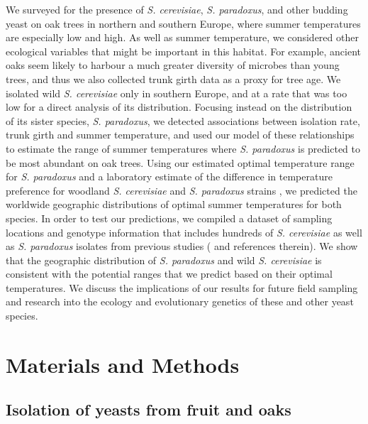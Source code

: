 \documentclass[12pt]{article}
\begin{document}
\begin{linenumbers}
We surveyed for the presence of \textit{S. cerevisiae}, \textit{S. paradoxus}, and other budding yeast on oak trees in northern and southern Europe, where summer temperatures are especially low and high. As well as summer temperature, we considered other ecological variables that might be important in this habitat. For example, ancient oaks seem likely to harbour a much greater diversity of microbes than young trees, and thus we also collected trunk girth data as a proxy for tree age. We isolated wild \textit{S. cerevisiae} only in southern Europe, and at a rate that was too low for a direct analysis of its distribution. Focusing instead on the distribution of its sister species, \textit{S. paradoxus}, we detected associations between isolation rate, trunk girth and summer temperature, and used our model of these relationships to estimate the range of summer temperatures where \textit{S. paradoxus} is predicted to be most abundant on oak trees. Using our estimated optimal temperature range for \textit{S. paradoxus} and a laboratory estimate of the difference in temperature preference for woodland \textit{S. cerevisiae} and \textit{S. paradoxus} strains \citep{sweeney_sympatric_2004}, we predicted the worldwide geographic distributions of optimal summer temperatures for both species. In order to test our predictions, we compiled a dataset of sampling locations and genotype information that includes hundreds of \textit{S. cerevisiae} as well as \textit{S. paradoxus} isolates from previous studies (\citealp{liti_population_2009, zhang_saccharomyces_2010,kuehne_allopatric_2007,leducq_local_2014,naumov_differentiation_1997,cromie_genomic_2013,wang_surprisingly_2012,almeida_population_2015} and references therein). We show that the geographic distribution of  \textit{S. paradoxus} and wild \textit{S. cerevisiae} is consistent with the potential ranges that we predict based on their optimal temperatures. We discuss the implications of our results for future field sampling and research into the ecology and evolutionary genetics of these and other yeast species.

\clearpage

\section*{Materials and Methods}
\label{sec:Methods}

\subsection*{Isolation of yeasts from fruit and oaks}


\end{linenumbers}
\end{document}
